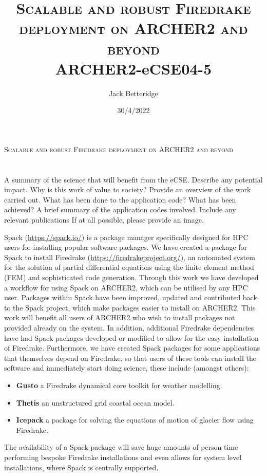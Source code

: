 \documentclass[a4paper,11pt]{article}
\title{\textsc{Scalable and robust Firedrake deployment on ARCHER2 and beyond}\\
\Large ARCHER2-eCSE04-5}
\author{Jack Betteridge}
\date{30/4/2022}
\begin{document}


\begin{center}\huge\textsc{Scalable and robust Firedrake deployment on ARCHER2 and beyond}\end{center}
\section*{}
\label{sec:intro}
    A summary of the science that will benefit from the eCSE. Describe any potential impact. Why is this work of value to society?
    Provide an overview of the work carried out. What has been done to the application code? What has been achieved?
    A brief summary of the application codes involved. 
    Include any relevant publications
    If at all possible, please provide an image. 

Spack (\url{https://spack.io/}) is a package manager specifically designed for HPC users for installing popular software packages.
We have created a package for Spack to install Firedrake (\url{https://firedrakeproject.org/}), an automated system for the solution of partial differential equations using the finite element method (FEM) and sophisticated code generation.
Through this work we have developed a workflow for using Spack on ARCHER2, which can be utilised by any HPC user.
Packages within Spack have been improved, updated and contributed back to the Spack project, which make packages easier to install on ARCHER2.
This work will benefit all users of ARCHER2 who wish to install packages not provided already on the system.
In addition, additional Firedrake dependencies have had Spack packages developed or modified to allow for the easy installation of Firedrake.
Furthermore, we have created Spack packages for some applications that themselves depend on Firedrake, so that users of these tools can install the software and immediately start doing science, these include (amongst others):
\begin{itemize}
	\item \textbf{Gusto} a Firedrake dynamical core toolkit for weather modelling.
	\item \textbf{Thetis} an unstructured grid coastal ocean model.
	\item \textbf{Icepack} a package for solving the equations of motion of glacier flow using Firedrake.
\end{itemize}
The availability of a Spack package will save huge amounts of person time performing bespoke Firedrake installations and even allows for system level installations, where Spack is centrally supported.
\end{document}
